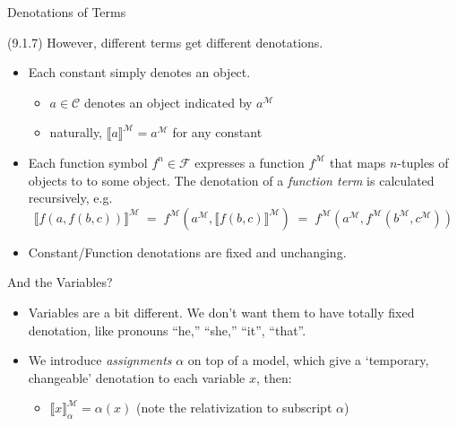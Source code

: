 \begin{frame}{Denotations of Terms}

	(9.1.7) However, different terms get different denotations.
	
	\medskip
		
	\begin{itemize}%
	\itemsep=16pt
			
				\item Each constant simply denotes an object.
				
				\begin{itemize}
				
					\item[] $a\in\mathcal{C}$ denotes an object indicated by $a^\mathcal{M}$
					\item[] naturally, $\llbracket a\rrbracket^\mathcal{M}=a^\mathcal{M}$ for any constant
				
				\end{itemize}
				
				\item Each function symbol $f^n\in\mathcal{F}$ expresses a function $f^\mathcal{M}$ that maps $n$-tuples of objects to to some object. The denotation of a \emph{function term} is calculated recursively, e.g.
				\small
				\[
				\llbracket f(a,f(b,c))\rrbracket^\mathcal{M}
				\;=\;
				f^\mathcal{M}(a^\mathcal{M}, \llbracket f(b,c)\rrbracket^\mathcal{M})
				\;=\;
				f^\mathcal{M}(a^\mathcal{M}, f^\mathcal{M}(b^\mathcal{M}, c^\mathcal{M}))
				\]
				\normalsize
	
				\item Constant/Function denotations are fixed and unchanging.

			\end{itemize}

\end{frame}

\begin{frame}{And the Variables?}

	\begin{itemize}%
	\itemsep=16pt
	
	\item Variables are a bit different. We don't want them to have totally fixed denotation, like pronouns  ``he,'' ``she,'' ``it'', ``that''.
	
		\item We introduce \emph{assignments} $\alpha$ on top of a model, which give a `temporary, changeable' denotation to each variable $x$, then:
		
		\begin{itemize}
		
			\item[] $\llbracket x\rrbracket^\mathcal{M}_\alpha=\alpha(x)$
			\quad
			\alert{(note the relativization to subscript $\alpha$)}
		
		\end{itemize}
	
	\end{itemize}


\end{frame}

